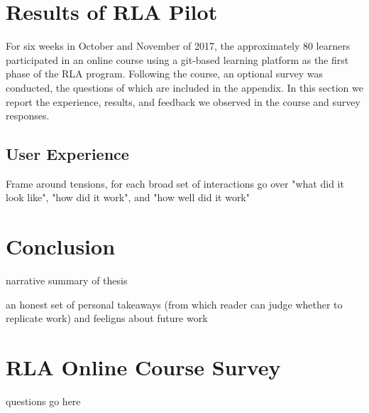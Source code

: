 \documentclass[12pt,twoside,vi]{mitthesis}
\newcommand{\wip}[1]{{\color{red} #1}}
\begin{document}
\chapter{Results of RLA Pilot}

For six weeks in October and November of 2017, the approximately 80 learners participated in an online course using a git-based learning platform as the first phase of the RLA program. Following the course, an optional survey was conducted, the questions of which are included in the appendix. In this section we report the experience, results, and feedback we observed in the course and survey responses.

\section{User Experience}

\wip{Frame around tensions, for each broad set of interactions go over "what did it look like", "how did it work", and "how well did it work"}

\chapter{Conclusion}

\wip{narrative summary of thesis

an honest set of personal takeaways (from which reader can judge whether to replicate work) and feeligns about future work}


\appendix
\chapter{RLA Online Course Survey}
\wip{questions go here}
\clearpage
\newpage
\begin{singlespace}
\nocite{*}
 

\end{singlespace}
\end{document}
